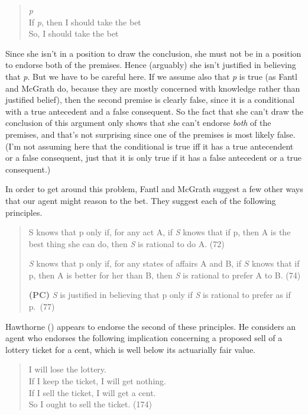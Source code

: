 \documentclass[
  11pt,
  letterpaper,
  DIV=11,
  numbers=noendperiod,
  oneside]{scrartcl}
\begin{document}
\begin{quote}
\emph{p}\\
If \emph{p}, then I should take the bet\\
So, I should take the bet
\end{quote}

Since she isn't in a position to draw the conclusion, she must not be in
a position to endorse both of the premises. Hence (arguably) she isn't
justified in believing that \emph{p}. But we have to be careful here. If
we assume also that \emph{p} is true (as Fantl and McGrath do, because
they are mostly concerned with knowledge rather than justified belief),
then the second premise is clearly false, since it is a conditional with
a true antecedent and a false consequent. So the fact that she can't
draw the conclusion of this argument only shows that she can't endorse
\emph{both} of the premises, and that's not surprising since one of the
premises is most likely false. (I'm not assuming here that the
conditional is true iff it has a true antecendent or a false consequent,
just that it is only true if it has a false antecedent or a true
consequent.)

In order to get around this problem, Fantl and McGrath suggest a few
other ways that our agent might reason to the bet. They suggest each of
the following principles.

\begin{quote}
S knows that p only if, for any act A, if \emph{S} knows that if p, then
A is the best thing she can do, then \emph{S} is rational to do A. (72)

\emph{S} knows that p only if, for any states of affairs A and B, if
\(S\) knows that if p, then A is better for her than B, then \emph{S} is
rational to prefer A to B. (74)

\textbf{(PC)} \emph{S} is justified in believing that p only if \emph{S}
is rational to prefer as if p.~(77)
\end{quote}

Hawthorne () appears to
endorse the second of these principles. He considers an agent who
endorses the following implication concerning a proposed sell of a
lottery ticket for a cent, which is well below its actuarially fair
value.

\begin{quote}
I will lose the lottery.\\
If I keep the ticket, I will get nothing.\\
If I sell the ticket, I will get a cent.\\
So I ought to sell the ticket. (174)
\end{quote}
\end{document}

